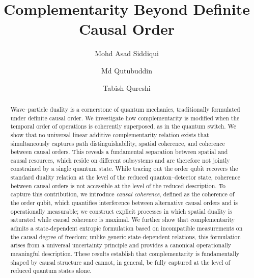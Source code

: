 \documentclass[aps,pra,reprint,superscriptaddress]{revtex4-2}
\begin{document}
	
	\title{Complementarity Beyond Definite Causal Order}
	
	
	\author{Mohd Asad Siddiqui\;}
	
	\author{Md Qutubuddin\;}
	
	\author{Tabish Qureshi\;}
	
	
    
\begin{abstract}
Wave--particle duality is a cornerstone of quantum mechanics, traditionally formulated under definite causal order. We investigate how complementarity is modified when the temporal order of operations is coherently superposed, as in the quantum switch. We show that no universal linear additive complementarity relation exists that simultaneously captures path distinguishability, spatial coherence, and coherence between causal orders. This reveals a fundamental separation between spatial and causal resources, which reside on different subsystems and are therefore not jointly constrained by a single quantum state. While tracing out the order qubit recovers the standard duality relation at the level of the reduced quanton--detector state, coherence between causal orders is not accessible at the level of the reduced description. To capture this contribution, we introduce \emph{causal coherence}, defined as the coherence of the order qubit, which quantifies interference between alternative causal orders and is operationally measurable; we construct explicit processes in which spatial duality is saturated while causal coherence is maximal. We further show that complementarity admits a state-dependent entropic formulation based on incompatible measurements on the causal degree of freedom; unlike generic state-dependent relations, this formulation arises from a universal uncertainty principle and provides a canonical operationally meaningful description. These results establish that complementarity is fundamentally shaped by causal structure and cannot, in general, be fully captured at the level of reduced quantum states alone.
\end{abstract}
\end{document}
